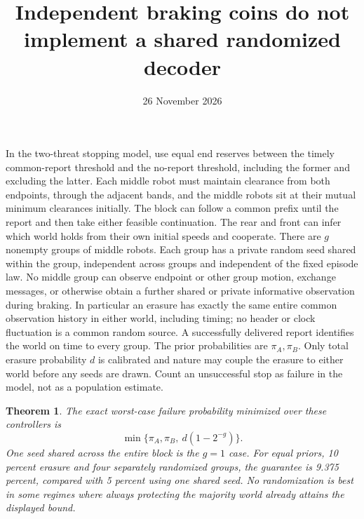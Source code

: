 \documentclass[11pt]{article}
\title{Independent braking coins do not implement a shared randomized decoder}
\author{}
\date{26 November 2026}
\newtheorem{theorem}{Theorem}
\begin{document}
\maketitle

In the two-threat stopping model, use equal end reserves between the timely common-report threshold and the no-report threshold, including the former and excluding the latter. Each middle robot must maintain clearance from both endpoints, through the adjacent bands, and the middle robots sit at their mutual minimum clearances initially. The block can follow a common prefix until the report and then take either feasible continuation. The rear and front can infer which world holds from their own initial speeds and cooperate. There are $g$ nonempty groups of middle robots. Each group has a private random seed shared within the group, independent across groups and independent of the fixed episode law. No middle group can observe endpoint or other group motion, exchange messages, or otherwise obtain a further shared or private informative observation during braking. In particular an erasure has exactly the same entire common observation history in either world, including timing; no header or clock fluctuation is a common random source. A successfully delivered report identifies the world on time to every group. The prior probabilities are $\pi_A,\pi_B$. Only total erasure probability $d$ is calibrated and nature may couple the erasure to either world before any seeds are drawn. Count an unsuccessful stop as failure in the model, not as a population estimate.

\begin{theorem}
The exact worst-case failure probability minimized over these controllers is
\[
 \min\{\pi_A,\pi_B,\ d(1-2^{-g})\}.
\]
One seed shared across the entire block is the $g=1$ case. For equal priors, 10 percent erasure and four separately randomized groups, the guarantee is 9.375 percent, compared with 5 percent using one shared seed. No randomization is best in some regimes where always protecting the majority world already attains the displayed bound.
\end{theorem}
\end{document}
